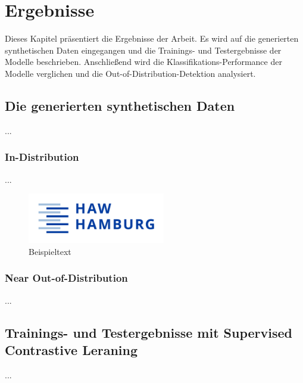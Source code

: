 \chapter{Ergebnisse}

Dieses Kapitel präsentiert die Ergebnisse der Arbeit. Es wird auf die generierten synthetischen Daten eingegangen und die Trainings- und Testergebnisse der Modelle beschrieben. Anschließend wird die Klassifikations-Performance der Modelle verglichen und die Out-of-Distribution-Detektion analysiert.

\section{Die generierten synthetischen Daten}

...

\subsection{In-Distribution}

...

\begin{figure}[]
	\centering
	\includegraphics[width=6cm]{logo_haw}
	\caption{Beispieltext}
\end{figure}

\subsection{Near Out-of-Distribution}

...

\section{Trainings- und Testergebnisse mit Supervised Contrastive Leraning}

...

